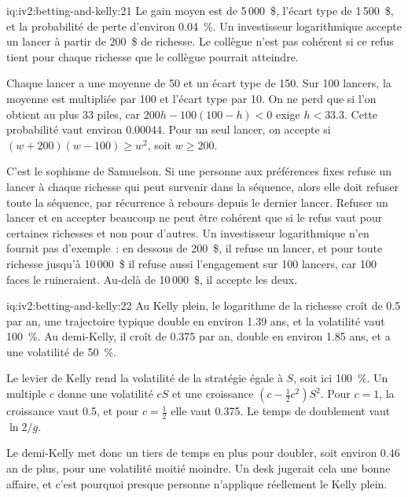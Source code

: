 \begin{solution}{iq:iv2:betting-and-kelly:21}
Le gain moyen est de 5\,000~\$, l'écart type de 1\,500~\$, et la probabilité de perte d'environ 0.04~\%. Un investisseur logarithmique accepte un lancer à partir de 200~\$ de richesse. Le collègue n'est pas cohérent si ce refus tient pour chaque richesse que le collègue pourrait atteindre.

Chaque lancer a une moyenne de 50 et un écart type de 150. Sur 100 lancers, la moyenne est multipliée par 100 et l'écart type par 10. On ne perd que si l'on obtient au plus 33 piles, car $200h - 100(100 - h) < 0$ exige $h < 33.3$. Cette probabilité vaut environ 0.00044. Pour un seul lancer, on accepte si $(w + 200)(w - 100) \geq w^2$, soit $w \geq 200$.

C'est le sophisme de Samuelson. Si une personne aux préférences fixes refuse un lancer à chaque richesse qui peut survenir dans la séquence, alors elle doit refuser toute la séquence, par récurrence à rebours depuis le dernier lancer. Refuser un lancer et en accepter beaucoup ne peut être cohérent que si le refus vaut pour certaines richesses et non pour d'autres. Un investisseur logarithmique n'en fournit pas d'exemple~: en dessous de 200~\$, il refuse un lancer, et pour toute richesse jusqu'à 10\,000~\$ il refuse aussi l'engagement sur 100 lancers, car 100 faces le ruineraient. Au-delà de 10\,000~\$, il accepte les deux.

\end{solution}

\begin{solution}{iq:iv2:betting-and-kelly:22}
Au Kelly plein, le logarithme de la richesse croît de 0.5 par an, une trajectoire typique double en environ 1.39 ans, et la volatilité vaut 100~\%. Au demi-Kelly, il croît de 0.375 par an, double en environ 1.85 ans, et a une volatilité de 50~\%.

Le levier de Kelly rend la volatilité de la stratégie égale à $S$, soit ici 100~\%. Un multiple $c$ donne une volatilité $cS$ et une croissance $(c - \tfrac12 c^2)S^2$. Pour $c = 1$, la croissance vaut 0.5, et pour $c = \tfrac12$ elle vaut 0.375. Le temps de doublement vaut $\ln 2/g$.

Le demi-Kelly met donc un tiers de temps en plus pour doubler, soit environ 0.46 an de plus, pour une volatilité moitié moindre. Un desk jugerait cela une bonne affaire, et c'est pourquoi presque personne n'applique réellement le Kelly plein.

\end{solution}

